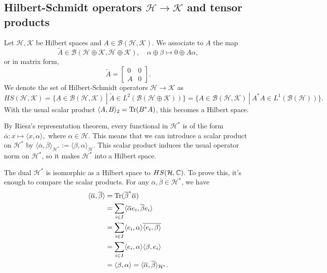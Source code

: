 \subsection{Hilbert-Schmidt operators $\mathcal{H} \to \mathcal{K}$ and tensor products}

Let $\mathcal{H}, \mathcal{K}$ be Hilbert spaces and $A \in \mathcal{B} (\mathcal{H}, \mathcal{K})$.
We associate to $A$ the map 
$$\widetilde{A} \in \mathcal{B} (\mathcal{H} \oplus \mathcal{K}, \mathcal{H} \oplus \mathcal{K}),\quad \alpha \oplus \beta \mapsto 0 \oplus A \alpha,$$
or in matrix form,
$$\widetilde{A} = \begin{bmatrix}
  0 & 0\\
  A & 0
\end{bmatrix}.$$
We denote the set of Hilbert-Schmidt operators $\mathcal{H} \to \mathcal{K}$ as 
$$HS (\mathcal{H}, \mathcal{K}) = \{A \in \mathcal{B} (\mathcal{H}, \mathcal{K})\ |\ \widetilde{A} \in L^2 (\mathcal{B}(\mathcal{H} \oplus \mathcal{K}))\} = \{A \in \mathcal{B} (\mathcal{H}, \mathcal{K})\ |\ A^* A \in L^1 (\mathcal{B}(\mathcal{H}))\}.$$
With the usual scalar product $\langle A, B \rangle_{2} = \operatorname{Tr}(B^* A)$, this becomes a Hilbert space.

\begin{remark}
  By Riesz's representation theorem, every functional in $\mathcal{H}^*$
  is of the form $\overline{\alpha}: x \mapsto \langle x, \alpha \rangle,$
  where $\alpha \in \mathcal{H}$. 
  This means that we can introduce a scalar product on $\mathcal{H}^*$ by 
  $\langle \overline{\alpha}, \overline{\beta} \rangle_{\mathcal{H}^*} := \langle \beta, \alpha \rangle_{\mathcal{H}}.$
  This scalar product induces the usual operator norm on $\mathcal{H}^*$, so it makes $\mathcal{H}^*$
  into a Hilbert space. 
\end{remark}

\begin{example}
  The dual $\mathcal{H}^*$ is isomorphic as a Hilbert space to $HS(\mathcal{H}, \mathbb {C})$. To prove this, it's enough to compare the scalar products.
  For any $\overline{\alpha}, \overline{\beta} \in \mathcal{H}^*$, we have 
  \begin{align*}
    \langle \overline{\alpha}, \overline{\beta} \rangle &= \operatorname{Tr} (\overline{\beta}^* \overline{\alpha})\\
    &= \sum_{i \in I} \langle \overline{\alpha} e_i, \overline{\beta} e_i\rangle\\
    &= \sum_{i \in I} \langle e_i, \alpha \rangle \overline{\langle e_i, \beta \rangle}\\
    &= \sum_{i \in I} \langle e_i, \alpha \rangle {\langle \beta, e_i \rangle}\\
    &= \langle \beta, \alpha\rangle = \langle \overline{\alpha}, \overline{\beta} \rangle_{\mathcal{H}^*}.
  \end{align*}
\end{example}

